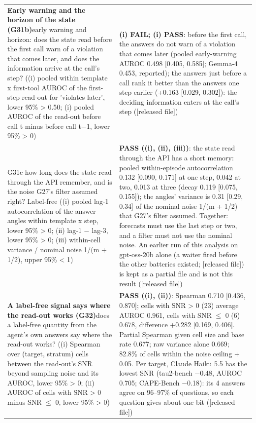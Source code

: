 {\begin{longtable}{p{}p{}}
\textbf{Early warning and the horizon of the state (G31b)}\newline early warning and horizon: does the state read before the first call warn of a violation that comes later, and does the information arrive at the call's step? ((i) pooled within template x first-tool AUROC of the first-step read-out for 'violates later', lower 95\% > 0.50; (i) pooled AUROC of the read-out before call t minus before call t$-$1, lower 95\% > 0) & \textbf{(i) FAIL; (i) PASS}: before the first call, the answers do not warn of a violation that comes later (pooled early-warning AUROC 0.498 [0.405, 0.585]; Gemma-4 0.453, reported); the answers just before a call rank it better than the answers one step earlier (+0.163 [0.029, 0.302]): the deciding information enters at the call's step ([released file])\\[2pt]
G31c how long does the state read through the API remember, and is the noise G27's filter assumed right? Label-free ((i) pooled lag-1 autocorrelation of the answer angles within template x step, lower 95\% > 0; (ii) lag-1 $-$ lag-3, lower 95\% > 0; (iii) within-cell variance / nominal noise 1/(m + 1/2), upper 95\% < 1) & \textbf{PASS ((i), (ii), (iii))}: the state read through the API has a short memory: pooled within-episode autocorrelation 0.132 [0.090, 0.171] at one step, 0.042 at two, 0.013 at three (decay 0.119 [0.075, 0.155]); the angles' variance is 0.31 [0.29, 0.34] of the nominal noise 1/(m + 1/2) that G27's filter assumed. Together: forecasts must use the last step or two, and a filter must not use the nominal noise. An earlier run of this analysis on gpt-oss-20b alone (a waiter fired before the other batteries existed; [released file]) is kept as a partial file and is not this result ([released file])\\[2pt]
\textbf{A label-free signal says where the read-out works (G32)}\newline does a label-free quantity from the agent's own answers say where the read-out works? ((i) Spearman over (target, stratum) cells between the read-out's SNR beyond sampling noise and its AUROC, lower 95\% > 0; (ii) AUROC of cells with SNR > 0 minus SNR $\leq$ 0, lower 95\% > 0) & \textbf{PASS ((i), (ii))}: Spearman 0.710 [0.436, 0.870]; cells with SNR > 0 (23) average AUROC 0.961, cells with SNR $\leq$ 0 (6) 0.678, difference +0.282 [0.169, 0.406]. Partial Spearman given cell size and base rate 0.677; raw variance alone 0.669; 82.8\% of cells within the noise ceiling + 0.05. Per target, Claude Haiku 5.5 has the lowest SNR (tau2-bench $-$0.48, AUROC 0.705; CAPE-Bench $-$0.18): its 4 answers agree on 96--97\% of questions, so each question gives about one bit ([released file])\\[2pt]

\end{longtable}}

